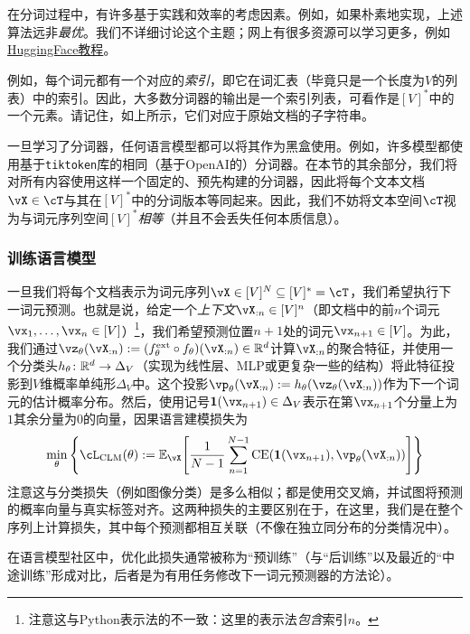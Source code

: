 \documentclass[../../book-main.tex]{subfiles}
\begin{document}
在分词过程中，有许多基于实践和效率的考虑因素。例如，如果朴素地实现，上述算法远非\textit{最优}。我们不详细讨论这个主题；网上有很多资源可以学习更多，例如\href{https://huggingface.co/learn/nlp-course/en/chapter6/5}{HuggingFace教程}。

例如，每个词元都有一个对应的\textit{索引}，即它在词汇表（毕竟只是一个长度为\(V\)的列表）中的索引。因此，大多数分词器的输出是一个索引列表，可看作是\([V]^{*}\)中的一个元素。请记住，如上所示，它们对应于原始文档的子字符串。

一旦学习了分词器，任何语言模型都可以将其作为黑盒使用。例如，许多模型都使用基于\texttt{tiktoken}库的相同（基于OpenAI的）分词器。在本节的其余部分，我们将对所有内容使用这样一个固定的、预先构建的分词器，因此将每个文本文档\(\vX \in \cT\)与其在\([V]^{*}\)中的分词版本等同起来。因此，我们不妨将文本空间\(\cT\)视为与词元序列空间\([V]^{*}\)\textit{相等}（并且不会丢失任何本质信息）。

\subsubsection{训练语言模型}

一旦我们将每个文档表示为词元序列\(\vX \in [V]^{N} \subseteq [V]^{*} = \cT\)，我们希望执行下一词元预测。也就是说，给定一个\textit{上下文}\(\vX_{:n} \in [V]^{n}\)（即文档中的前\(n\)个词元\(\vx_{1}, \dots, \vx_{n} \in [V]\)）\footnote{注意这与Python表示法的不一致：这里的表示法\textit{包含}索引\(n\)。}，我们希望预测位置\(n + 1\)处的词元\(\vx_{n + 1} \in [V]\)。为此，我们通过\(\vz_{\theta}(\vX_{:n}) := (f_{\theta}^{\ext} \circ f_{\theta})(\vX_{:n}) \in \R^{d}\)计算\(\vX_{:n}\)的聚合特征，并使用一个分类头\(h_{\theta} \colon \mathbb{R}^{d} \to \Delta_{V}\)（实现为线性层、MLP或更复杂一些的结构）将此特征投影到\(V\)维概率单纯形\(\Delta_{V}\)中。这个投影\(\vp_{\theta}(\vX_{:n}) := h_{\theta}(\vz_{\theta}(\vX_{:n}))\)作为下一个词元的估计概率分布。然后，使用记号\(\vone(\vx_{n + 1}) \in \Delta_{V}\)表示在第\(\vx_{n + 1}\)个分量上为\(1\)其余分量为\(0\)的向量，因果语言建模损失为
\begin{equation}\label{eq:clm_loss}
    \min_{\theta}\bc{\cL_{\mathrm{CLM}}(\theta) := \Ex_{\vX}\rs{\frac{1}{N - 1}\sum_{n = 1}^{N - 1}\CE(\vone(\vx_{n + 1}), \vp_{\theta}(\vX_{:n}))}}
\end{equation}
注意这与分类损失（例如图像分类）是多么相似；都是使用交叉熵，并试图将预测的概率向量与真实标签对齐。这两种损失的主要区别在于，在这里，我们是在整个序列上计算损失，其中每个预测都相互关联（不像在独立同分布的分类情况中）。

在语言模型社区中，优化此损失通常被称为“预训练”（与“后训练”以及最近的“中途训练”形成对比，后者是为有用任务修改下一词元预测器的方法论）。
\end{document}
